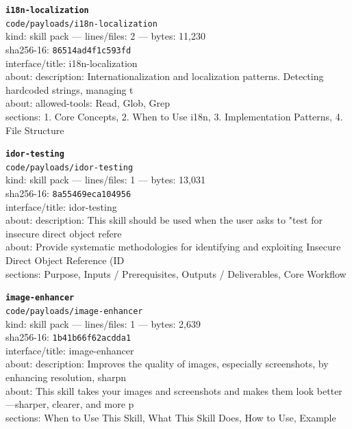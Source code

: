 \noindent\textbf{\texttt{i18n-localization}}\\
\texttt{code/payloads/i18n-localization}\\
kind: skill pack --- lines/files: 2 --- bytes: 11,230\\
sha256-16: \texttt{86514ad4f1c593fd}\\
interface/title: i18n-localization\\
about: description: Internationalization and localization patterns. Detecting hardcoded strings, managing t\\
about: allowed-tools: Read, Glob, Grep\\
sections: 1. Core Concepts, 2. When to Use i18n, 3. Implementation Patterns, 4. File Structure\\
\vspace*{6.0pt}
\newpage

\noindent\textbf{\texttt{idor-testing}}\\
\texttt{code/payloads/idor-testing}\\
kind: skill pack --- lines/files: 1 --- bytes: 13,031\\
sha256-16: \texttt{8a55469eca104956}\\
interface/title: idor-testing\\
about: description: This skill should be used when the user asks to "test for insecure direct object refere\\
about: Provide systematic methodologies for identifying and exploiting Insecure Direct Object Reference (ID\\
sections: Purpose, Inputs / Prerequisites, Outputs / Deliverables, Core Workflow\\
\vspace*{6.0pt}

\noindent\textbf{\texttt{image-enhancer}}\\
\texttt{code/payloads/image-enhancer}\\
kind: skill pack --- lines/files: 1 --- bytes: 2,639\\
sha256-16: \texttt{1b41b66f62acdda1}\\
interface/title: image-enhancer\\
about: description: Improves the quality of images, especially screenshots, by enhancing resolution, sharpn\\
about: This skill takes your images and screenshots and makes them look better—sharper, clearer, and more p\\
sections: When to Use This Skill, What This Skill Does, How to Use, Example\\
\vspace*{6.0pt}

